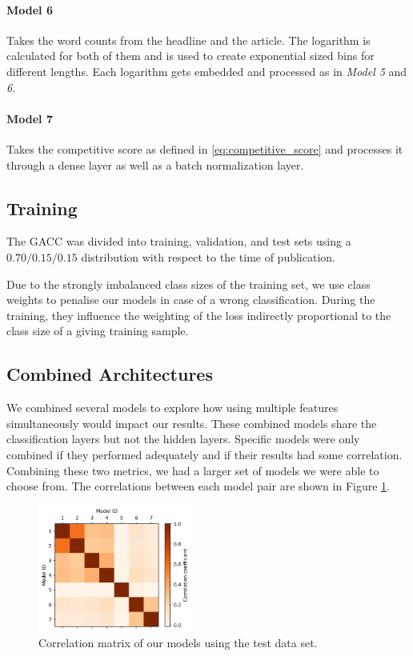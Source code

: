 \paragraph{Model 6} 
Takes the word counts from the headline and the article.
The logarithm is calculated for both of them and is used to create exponential sized bins for different lengths.
Each logarithm gets embedded and processed as in \textit{Model 5} and \textit{6}.

\paragraph{Model 7} 
Takes the competitive score as defined in \autoref{eq:competitive_score} and processes it through a dense layer as well as a batch normalization layer.

\subsection{Training}
The GACC was divided into training, validation, and test sets using a $0.70/0.15/0.15$  distribution with respect to the time of publication.

Due to the strongly imbalanced class sizes of the training set, we use class weights to penalise our models in case of a wrong classification.
During the training, they influence the weighting of the loss indirectly proportional to the class size of a giving training sample.

\subsection{Combined Architectures}
We combined several models to explore how using multiple features simultaneously would impact our results.
These combined models share the classification layers but not the hidden layers.
Specific models were only combined if they performed adequately and if their results had some correlation.
Combining these two metrics, we had a larger set of models we were able to choose from.
The correlations between each model pair are shown in Figure \ref{fig:correlation_matrix}. 

\begin{figure}[h]
	\includegraphics[width=0.45\textwidth]{fig/correlations.png}
	\caption{\textmd{Correlation matrix of our models using the test data set.}}
	\label{fig:correlation_matrix}
\end{figure}
